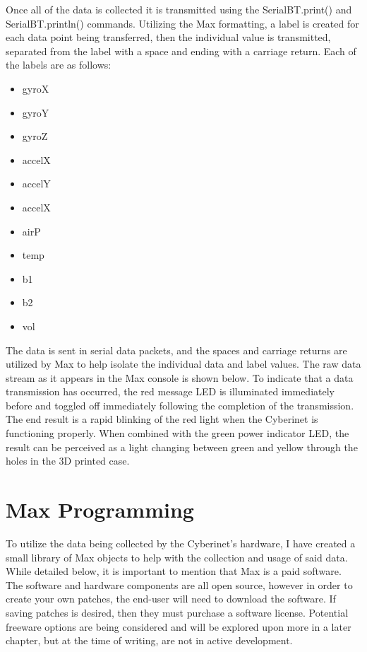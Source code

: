 Once all of the data is collected it is transmitted using the SerialBT.print() and SerialBT.println() commands. Utilizing the Max formatting, a label is created for each data point being transferred, then the individual value is transmitted, separated from the label with a space and ending with a carriage return. Each of the labels are as follows:

\begin{itemize}
    \item gyroX
    \item gyroY
    \item gyroZ
    \item accelX
    \item accelY
    \item accelX
    \item airP
    \item temp
    \item b1
    \item b2
    \item vol
\end{itemize}

The data is sent in serial data packets, and the spaces and carriage returns are utilized by Max to help isolate the individual data and label values. The raw data stream as it appears in the Max console is shown below. To indicate that a data transmission has occurred, the red message LED is illuminated immediately before and toggled off immediately following the completion of the transmission. The end result is a rapid blinking of the red light when the Cyberinet is functioning properly. When combined with the green power indicator LED, the result can be perceived as a light changing between green and yellow through the holes in the 3D printed case.


\section{Max Programming}

To utilize the data being collected by the Cyberinet’s hardware, I have created a small library of Max objects to help with the collection and usage of said data. While detailed below, it is important to mention that Max is a paid software. The software and hardware components are all open source, however in order to create your own patches, the end-user will need to download the software. If saving patches is desired, then they must purchase a software license. Potential freeware options are being considered and will be explored upon more in a later chapter, but at the time of writing, are not in active development.

